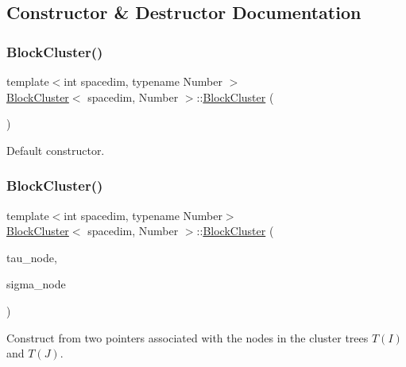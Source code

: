 \subsection{Constructor \& Destructor Documentation}
\mbox{\label{classBlockCluster_a0b85fdaddc12a14d57db884e287cd24e}} 
\subsubsection{\texorpdfstring{Block\+Cluster()}{BlockCluster()}\hspace{0.1cm}{\footnotesize\ttfamily [1/2]}}
{\footnotesize\ttfamily template$<$int spacedim, typename Number $>$ \\
\hyperlink{classBlockCluster}{Block\+Cluster}$<$ spacedim, Number $>$\+::\hyperlink{classBlockCluster}{Block\+Cluster} (\begin{DoxyParamCaption}{ }\end{DoxyParamCaption})}

Default constructor. \mbox{\label{classBlockCluster_a63fdb3f4bea6a446b34cb34274731df0}} 
\subsubsection{\texorpdfstring{Block\+Cluster()}{BlockCluster()}\hspace{0.1cm}{\footnotesize\ttfamily [2/2]}}
{\footnotesize\ttfamily template$<$int spacedim, typename Number$>$ \\
\hyperlink{classBlockCluster}{Block\+Cluster}$<$ spacedim, Number $>$\+::\hyperlink{classBlockCluster}{Block\+Cluster} (\begin{DoxyParamCaption}\item[{typename \hyperlink{classClusterTree}{Cluster\+Tree}$<$ spacedim, Number $>$\+::node\+\_\+pointer\+\_\+type}]{tau\+\_\+node,  }\item[{typename \hyperlink{classClusterTree}{Cluster\+Tree}$<$ spacedim, Number $>$\+::node\+\_\+pointer\+\_\+type}]{sigma\+\_\+node }\end{DoxyParamCaption})}

Construct from two pointers associated with the nodes in the cluster trees $T(I)$ and $T(J)$.


